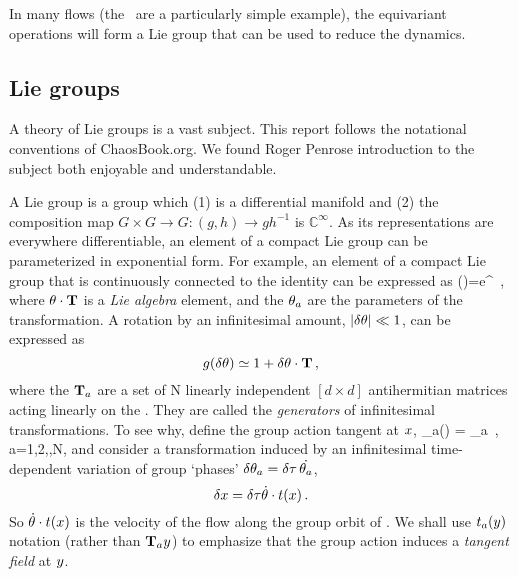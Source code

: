 {In many flows (the \cLe\ are a particularly simple example),
the equivariant operations
will form a Lie group that can be used to reduce the
dynamics.

\subsection{Lie groups}

A theory of Lie groups is a vast subject. This report follows the notational conventions of ChaosBook.org. We found Roger Penrose introduction to the subject both enjoyable and understandable.

A Lie group is a group which (1) is a differential manifold
and (2) the composition map $G \times G \rightarrow G : (g,h)
\rightarrow g h^{-1}$ is $\mathbb{C}^\infty$.
As its representations are everywhere differentiable, an element of a compact Lie group can be parameterized in exponential form.
For example,
an element of a compact Lie group that is continuously
connected to the identity can be expressed as
\beq
\LieEl(\gSpace)=e^{{\gSpace} \cdot \Lg }
\,,
where $\gSpace \cdot \Lg$ is a \emph{Lie algebra} element,
and the $\gSpace_a$ are the parameters of the transformation.
%
A rotation by an infinitesimal amount, $|\delta \gSpace| \ll
1$, can be expressed as
\[
\LieEl(\delta \gSpace) \simeq 1 + \delta \gSpace \cdot \Lg
\,,
\]
where the $\mathbf{T}_a$ are a set of N linearly independent
$[d\times d]$ antihermitian matrices acting linearly on the
{\statesp}. They are called the \emph{generators} of
infinitesimal transformations.
To see why, define the group action tangent at $x$,
\beq
 \groupTan_{a}(\ssp) = \Lg _{a} \ssp
    \,,\qquad
 a=1,2,\cdots,N,
and consider a transformation induced by an infinitesimal
time-dependent variation of group `phases'
$\delta \gSpace_a = \timeStep \, \dot{\gSpace_a}$,
\[
\delta \ssp = \timeStep \dot{\gSpace} \cdot \groupTan(\ssp)
\,.
\]
So $\dot{{\bf \theta}} \cdot t(x)$ is the velocity
of the flow along the group orbit of \ssp.
We shall use $t_a(y)$ notation (rather than
$\mathbf{T}_{a}y$) to emphasize that the group action
induces a \emph{tangent field} at $y$.

}
